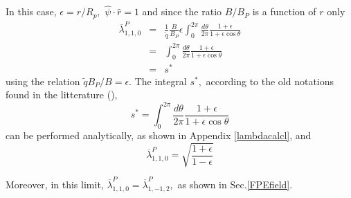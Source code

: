 In this case, $\epsilon =r/R_{p},$ $\widehat{\psi }\cdot \widehat{r}=1$ and
since the ratio $B/B_{P}$ is a function of $r$ only
\begin{eqnarray}
\overline{\lambda }_{1,1,0}^{P} &=&\frac{1}{\widetilde{q}}\frac{B}{B_{P}}%
\epsilon \int_{0}^{2\pi }\frac{d\theta }{2\pi }\frac{1+\epsilon }{1+\epsilon
\cos \theta }  \nonumber \\
&=&\int_{0}^{2\pi }\frac{d\theta }{2\pi }\frac{1+\epsilon }{1+\epsilon \cos
\theta }  \nonumber \\
&=&s^{*}
\end{eqnarray}
using the relation $\widetilde{q}B_{P}/B=\epsilon .$ The integral $s^{*},$
according to the old notations found in the litterature (\cite{kil86}),
\begin{equation}
s^{*}=\int_{0}^{2\pi }\frac{d\theta }{2\pi }\frac{1+\epsilon }{1+\epsilon
\cos \theta }
\end{equation}
can be performed analytically, as shown in Appendix \ref{lambdacalcl}, and
\begin{equation}
\overline{\lambda }_{1,1,0}^{P}=\sqrt{\frac{1+\epsilon }{1-\epsilon }}
\end{equation}

Moreover, in this limit, $\overline{\lambda }_{1,1,0}^{P}=\overline{\lambda }%
_{1,-1,2}^{P},$ as shown in Sec.\ref{FPEfield}.
